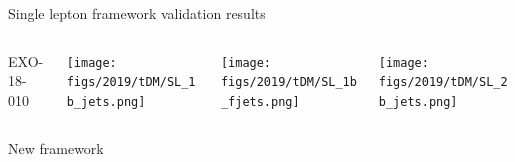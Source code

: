 \documentclass[9pt]{beamer}
\begin{document}
\begin{frame}{\alert{Single lepton} framework validation results}
\justifying
\begin{columns}
		\hspace{5pt}
		\begin{column}{0.05\textwidth}
			\begin{block}{ {EXO-18-010}}\end{block}		
		\end{column} \hfill
		\begin{column}{0.32\textwidth}
			\begin{center}
     			\texttt{[image: figs/2019/tDM/SL\_1b\_jets.png]}
    		\end{center}		
		\end{column} \hfill
		\begin{column}{0.32\textwidth}
			\begin{center}
     			\texttt{[image: figs/2019/tDM/SL\_1b\_fjets.png]}
    		\end{center}		
		\end{column} \hfill
		\begin{column}{0.32\textwidth}
			\begin{center}
     			\texttt{[image: figs/2019/tDM/SL\_2b\_jets.png]}
   			 \end{center}
		\end{column} \hfill
	\end{columns} \vspace{-5pt}
	\begin{columns}
		\hspace{5pt}
		\begin{column}{0.05\textwidth}
			\begin{block}{ {New framework}}\end{block}	

\end{column}
\end{columns}
\end{frame}
\end{document}
